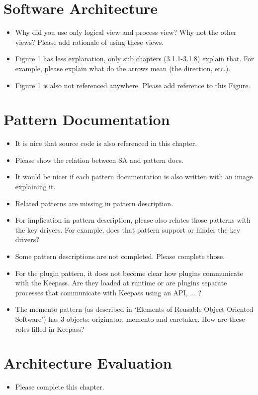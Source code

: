 \documentclass[a4paper,10pt]{article}
\begin{document}
\section{Software Architecture}
\begin{itemize}
	\item Why did you use only logical view and process view? Why not the other views? Please add rationale of using these views.
	\item Figure 1 has less explanation, only sub chapters (3.1.1-3.1.8) explain that. For example, please explain what do the arrows mean (the direction, etc.). 
	\item Figure 1 is also not referenced anywhere. Please add reference to this Figure.

\end{itemize}

\section{Pattern Documentation}
\begin{itemize}
	\item It is nice that source code is also referenced in this chapter.
	\item Please show the relation between SA and pattern docs.
	\item It would be nicer if each pattern documentation is also written with an image explaining it.
	\item Related patterns are missing in pattern description.
	\item For implication in pattern description, please also relates those patterns with the key drivers. For example, does that pattern support or hinder the key drivers?
	\item Some pattern descriptions are not completed. Please complete those.
	\item For the plugin pattern, it does not become clear how plugins communicate with the Keepass. Are they loaded at runtime or are plugins separate processes that communicate with Keepass using an API, ... ?
	\item The memento pattern (as described in `Elements of Reusable Object-Oriented Software') has 3 objects: originator, memento and caretaker. How are these roles filled in Keepass?
\end{itemize}

\section{Architecture Evaluation}
\begin{itemize}
	\item Please complete this chapter.
\end{itemize}
\end{document}
